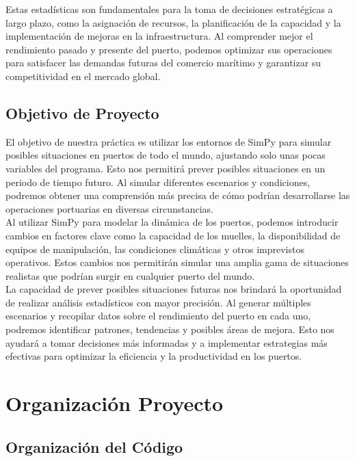 \documentclass[12pt]{article}
\begin{document}
        Estas estadísticas son fundamentales para la toma de decisiones estratégicas a largo plazo, como la asignación de recursos, la planificación de la capacidad y la implementación de mejoras en la infraestructura. Al comprender mejor el rendimiento pasado y presente del puerto, podemos optimizar sus operaciones para satisfacer las demandas futuras del comercio marítimo y garantizar su competitividad en el mercado global.\\


    \subsection{Objetivo de Proyecto}
    El objetivo de nuestra práctica es utilizar los entornos de SimPy para simular posibles situaciones en puertos de todo el mundo, ajustando solo unas pocas variables del programa. Esto nos permitirá prever posibles situaciones en un periodo de tiempo futuro. Al simular diferentes escenarios y condiciones, podremos obtener una comprensión más precisa de cómo podrían desarrollarse las operaciones portuarias en diversas circunstancias.\\

    Al utilizar SimPy para modelar la dinámica de los puertos, podemos introducir cambios en factores clave como la capacidad de los muelles, la disponibilidad de equipos de manipulación, las condiciones climáticas y otros imprevistos operativos. Estos cambios nos permitirán simular una amplia gama de situaciones realistas que podrían surgir en cualquier puerto del mundo.\\

    La capacidad de prever posibles situaciones futuras nos brindará la oportunidad de realizar análisis estadísticos con mayor precisión. Al generar múltiples escenarios y recopilar datos sobre el rendimiento del puerto en cada uno, podremos identificar patrones, tendencias y posibles áreas de mejora. Esto nos ayudará a tomar decisiones más informadas y a implementar estrategias más efectivas para optimizar la eficiencia y la productividad en los puertos.\\


\section{Organización Proyecto}
    \subsection{Organización del Código}
\end{document}
